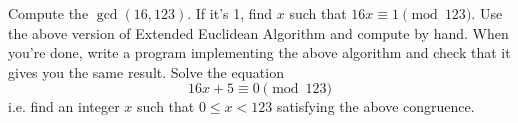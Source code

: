 Compute the $\gcd(16, 123)$.
If it's 1, find $x$ such that $16x \equiv 1 \pmod{123}$.
Use the above version of Extended Euclidean Algorithm and compute by hand.
When you're done, write a program implementing the above algorithm
and check that it gives you the same result.
Solve the equation
\[
16x + 5 \equiv 0 \pmod{123}
\]
i.e. find an integer $x$ such that $0 \leq x < 123$ satisfying the
above congruence.
